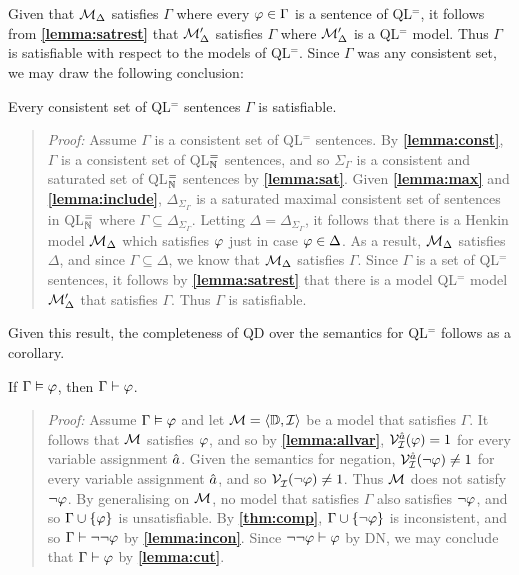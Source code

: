 Given that $\mathcal{M}_\Delta$ satisfies $\Gamma$ where every $\varphi\in\Gamma$ is a sentence of QL$^=$, it follows from \textbf{\ref{lemma:satrest}} that $\mathcal{M}'_\Delta$ satisfies $\Gamma$ where $\mathcal{M}'_\Delta$ is a QL$^=$ model. 
Thus $\Gamma$ is satisfiable with respect to the models of QL$^=$.
Since $\Gamma$ was any consistent set, we may draw the following conclusion:

  \begin{Tthm} \label{thm:comp}
    Every consistent set of QL$^=$ sentences $\Gamma$ is satisfiable. 
  \end{Tthm}

\begin{quote} 
  \textit{Proof:} 
  Assume $\Gamma$ is a consistent set of QL$^=$ sentences.
  By \textbf{\ref{lemma:const}}, $\Gamma$ is a consistent set of QL$^=_{\mathbb{N}}$ sentences, and so $\Sigma_\Gamma$ is a consistent and saturated set of QL$^=_{\mathbb{N}}$ sentences by \textbf{\ref{lemma:sat}}. 
  Given \textbf{\ref{lemma:max}} and \textbf{\ref{lemma:include}}, $\Delta_{\Sigma_\Gamma}$ is a saturated maximal consistent set of sentences in QL$^=_{\mathbb{N}}$ where $\Gamma\subseteq\Delta_{\Sigma_\Gamma}$.
  Letting $\Delta=\Delta_{\Sigma_\Gamma}$, it follows that there is a Henkin model $\mathcal{M}_\Delta$ which satisfies $\varphi$ just in case $\varphi\in\Delta$.
  As a result, $\mathcal{M}_\Delta$ satisfies $\Delta$, and since $\Gamma\subseteq\Delta$, we know that $\mathcal{M}_\Delta$ satisfies $\Gamma$.
  Since $\Gamma$ is a set of QL$^=$ sentences, it follows by \textbf{\ref{lemma:satrest}} that there is a model QL$^=$ model $\mathcal{M}'_\Delta$ that satisfies $\Gamma$.
  Thus $\Gamma$ is satisfiable.

\end{quote}

Given this result, the completeness of QD over the semantics for QL$^=$ follows as a corollary. 

\begin{Cthm}[Completeness] \label{cor:Completeness}
  If $\Gamma\vDash\varphi$, then $\Gamma\vdash\varphi$.
\end{Cthm}

\begin{quote} 
  \textit{Proof:} Assume $\Gamma\vDash\varphi$ and let $\mathcal{M}=\langle\mathbb{D},\mathcal{I}\rangle$ be a model that satisfies $\Gamma$.
  It follows that $\mathcal{M}$ satisfies $\varphi$, and so by \textbf{\ref{lemma:allvar}}, $\mathcal{V}_{\mathcal{I}}^{\hat{a}}(\varphi)=1$ for every variable assignment $\hat{a}$.
  Given the semantics for negation, $\mathcal{V}_{\mathcal{I}}^{\hat{a}}(\neg\varphi)\neq 1$ for every variable assignment $\hat{a}$, and so $\mathcal{V}_{\mathcal{I}}^{}(\neg\varphi)\neq 1$.
  Thus $\mathcal{M}$ does not satisfy $\neg\varphi$.
  By generalising on $\mathcal{M}$, no model that satisfies $\Gamma$ also satisfies $\neg\varphi$, and so $\Gamma\cup\lbrace\varphi\rbrace$ is unsatisfiable. 
  By \textbf{\ref{thm:comp}}, $\Gamma\cup\lbrace\neg\varphi\rbrace$ is inconsistent, and so $\Gamma\vdash\neg\neg\varphi$ by \textbf{\ref{lemma:incon}}.
  Since $\neg\neg\varphi\vdash\varphi$ by DN, we may conclude that $\Gamma\vdash\varphi$ by \textbf{\ref{lemma:cut}}.
\end{quote}

